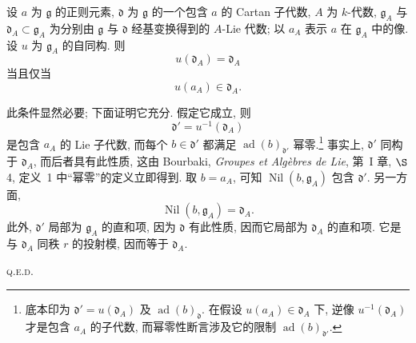 \begin{corollary}
设 \(a\) 为 \(\mathfrak g\) 的正则元素, \(\mathfrak d\) 为 \(\mathfrak g\) 的一个包含 \(a\) 的 Cartan 子代数, \(A\) 为 \(k\)-代数, \(\mathfrak g_A\) 与 \(\mathfrak d_A\subset\mathfrak g_A\) 为分别由 \(\mathfrak g\) 与 \(\mathfrak d\) 经基变换得到的 \(A\)-Lie 代数; 以 \(a_A\) 表示 \(a\) 在 \(\mathfrak g_A\) 中的像. 设 \(u\) 为 \(\mathfrak g_A\) 的自同构. 则
\[
  u(\mathfrak d_A)=\mathfrak d_A
\]
当且仅当
\[
  u(a_A)\in\mathfrak d_A.
\]
\end{corollary}

此条件显然必要; 下面证明它充分. 假定它成立, 则
\[
  \mathfrak d'=u^{-1}(\mathfrak d_A)
\]
是包含 \(a_A\) 的 Lie 子代数, 而每个 \(b\in\mathfrak d'\) 都满足 \(\operatorname{ad}(b)_{\mathfrak d'}\) 幂零.\footnote{底本印为 \(\mathfrak d'=u(\mathfrak d_A)\) 及 \(\operatorname{ad}(b)_{\mathfrak d}\). 在假设 \(u(a_A)\in\mathfrak d_A\) 下, 逆像 \(u^{-1}(\mathfrak d_A)\) 才是包含 \(a_A\) 的子代数, 而幂零性断言涉及它的限制 \(\operatorname{ad}(b)_{\mathfrak d'}\).}
事实上, \(\mathfrak d'\) 同构于 \(\mathfrak d_A\), 而后者具有此性质, 这由 Bourbaki, \emph{Groupes et Algèbres de Lie}, 第~I 章, \(\S\)4, 定义~1 中“幂零”的定义立即得到. 取 \(b=a_A\), 可知 \(\operatorname{Nil}(b,\mathfrak g_A)\) 包含 \(\mathfrak d'\). 另一方面,
\[
  \operatorname{Nil}(b,\mathfrak g_A)=\mathfrak d_A.
\]
此外, \(\mathfrak d'\) 局部为 \(\mathfrak g_A\) 的直和项, 因为 \(\mathfrak d\) 有此性质, 因而它局部为 \(\mathfrak d_A\) 的直和项. 它是与 \(\mathfrak d_A\) 同秩 \(r\) 的投射模, 因而等于 \(\mathfrak d_A\).
\par\hfill\textsc{q.e.d.}

